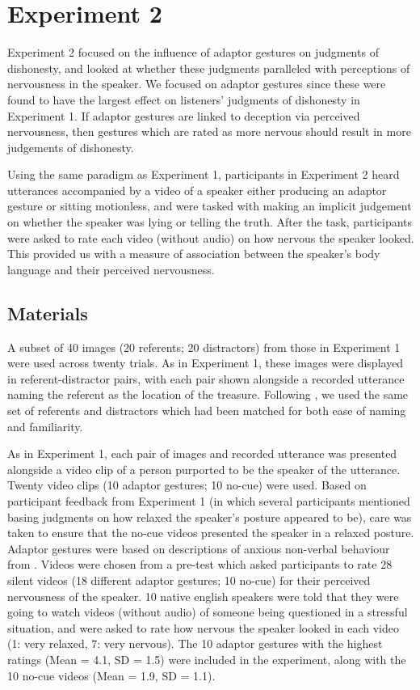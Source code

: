\documentclass[a4paper,man,natbib]{apa6}
\begin{document}
\section{Experiment 2}
Experiment 2 focused on the influence of adaptor gestures on judgments of dishonesty, and looked at whether these judgments paralleled with perceptions of nervousness in the speaker.
We focused on adaptor gestures since these were found to have the largest effect on listeners' judgments of dishonesty in Experiment 1. 
If adaptor gestures are linked to deception via perceived nervousness, then gestures which are rated as more nervous should result in more judgements of dishonesty. 

Using the same paradigm as Experiment 1, participants in Experiment 2 heard utterances accompanied by a video of a speaker either producing an adaptor gesture or sitting motionless, and were tasked with making an implicit judgement on whether the speaker was lying or telling the truth. 
After the task, participants were asked to rate each video (without audio) on how nervous the speaker looked.
This provided us with a measure of association between the speaker's body language and their perceived nervousness.

\subsection{Materials}
A subset of 40 images (20 referents; 20 distractors) from those in Experiment 1 were used across twenty trials.
As in Experiment 1, these images were displayed in referent-distractor pairs, with each pair shown alongside a recorded utterance naming the referent as the location of the treasure.
Following \citet{Loy2017}, we used the same set of referents and distractors which had been matched for both ease of naming and familiarity.


As in Experiment 1, each pair of images and recorded utterance was presented alongside a video clip of a person purported to be the speaker of the utterance.
Twenty video clips (10 adaptor gestures; 10 no-cue) were used. 
Based on participant feedback from Experiment 1 (in which several participants mentioned basing judgments on how relaxed the speaker's posture appeared to be), care was taken to ensure that the no-cue videos presented the speaker in a relaxed posture. 
Adaptor gestures were based on descriptions of anxious non-verbal behaviour from \citet{Gregersen2005}.
Videos were chosen from a pre-test which asked participants to rate 28 silent videos (18 different adaptor gestures; 10 no-cue) for their perceived nervousness of the speaker. 
10 native english speakers were told that they were going to watch videos (without audio) of someone being questioned in a stressful situation, and were asked to rate how nervous the speaker looked in each video (1: very relaxed, 7: very nervous). 
The 10 adaptor gestures with the highest ratings (Mean = 4.1, SD = 1.5) were included in the experiment, along with the 10 no-cue videos (Mean = 1.9, SD = 1.1).
\end{document}
